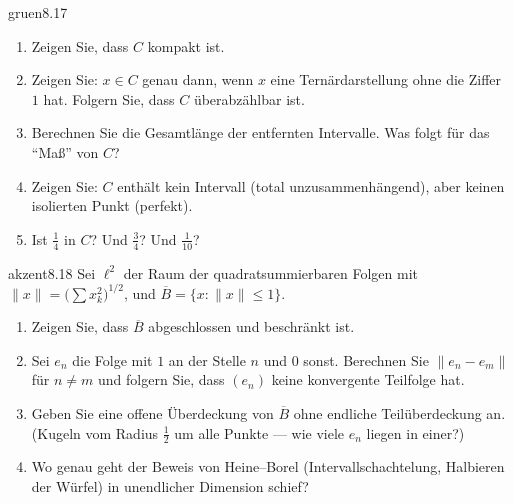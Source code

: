 \begin{karte}{gruen}{8.17}{\typwerk}{}
\begin{enumerate}[label=(\alph*),leftmargin=1.6em,itemsep=2pt]
\item Zeigen Sie, dass $C$ kompakt ist.
\item Zeigen Sie: $x\in C$ genau dann, wenn $x$ eine Ternärdarstellung ohne die Ziffer $1$ hat. Folgern Sie, dass $C$ überabzählbar ist.
\item Berechnen Sie die Gesamtlänge der entfernten Intervalle. Was folgt für das \enquote{Maß} von $C$?
\item Zeigen Sie: $C$ enthält kein Intervall (total unzusammenhängend), aber keinen isolierten Punkt (perfekt).
\item Ist $\frac14$ in $C$? Und $\frac34$? Und $\frac1{10}$?
\end{enumerate}
\end{karte}

\begin{karte}{akzent}{8.18}{\typstolper}{}
Sei $\ell^{2}$ der Raum der quadratsummierbaren Folgen mit $\|x\| = \bigl(\sum x_k^{2}\bigr)^{1/2}$, und $\overline B = \{x\colon\|x\|\le1\}$.
\begin{enumerate}[label=(\alph*),leftmargin=1.6em,itemsep=2pt]
\item Zeigen Sie, dass $\overline B$ abgeschlossen und beschränkt ist.
\item Sei $e_n$ die Folge mit $1$ an der Stelle $n$ und $0$ sonst. Berechnen Sie $\|e_n - e_m\|$ für $n\neq m$ und folgern Sie, dass $(e_n)$ keine konvergente Teilfolge hat.
\item Geben Sie eine offene Überdeckung von $\overline B$ ohne endliche Teilüberdeckung an. (Kugeln vom Radius $\frac12$ um alle Punkte --- wie viele $e_n$ liegen in einer?)
\item Wo genau geht der Beweis von Heine--Borel (Intervallschachtelung, Halbieren der Würfel) in unendlicher Dimension schief?
\end{enumerate}
\end{karte}

